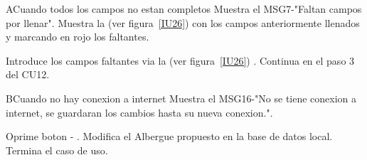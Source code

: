 \begin{UCtrayectoriaA}{A}{Cuando todos los campos no estan completos}
	\UCpaso Muestra el MSG7-"Faltan campos por llenar".
	\UCpaso Muestra la (ver figura~\ref{IU26}) con los campos anteriormente llenados y marcando en rojo los faltantes.
	\item\UCactor Introduce los campos faltantes via la (ver figura~\ref{IU26}) .
	\UCpaso Continua en el paso 3 del CU12.
\end{UCtrayectoriaA}

\begin{UCtrayectoriaA}{B}{Cuando no hay conexion a internet}
	\UCpaso Muestra el MSG16-"No se tiene conexion a internet, se guardaran los cambios hasta su nueva conexion.".
	\item\UCactor Oprime boton - .
	\UCpaso Modifica el Albergue propuesto  en la base de datos local.	
	\UCpaso[] Termina el caso de uso.
\end{UCtrayectoriaA}